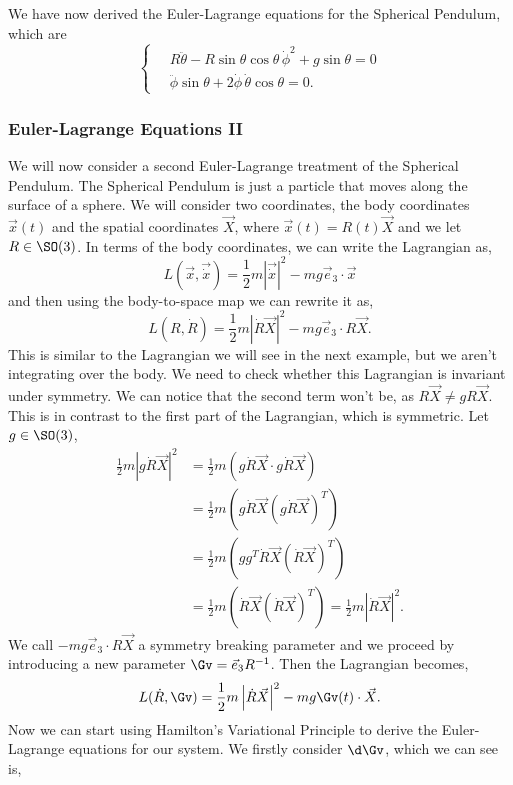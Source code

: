 We have now derived the Euler-Lagrange equations for the Spherical Pendulum, which are
$$ \begin{cases}
  \quad R\ddot{\theta} - R\sin \theta \cos \theta\,\dot \phi^2 + g\sin \theta = 0\\
  \quad\ddot\phi\sin \theta + 2\dot \phi\,\dot\theta\cos \theta = 0.
\end{cases} $$

\subsubsection{Euler-Lagrange Equations II}
We will now consider a second Euler-Lagrange treatment of the Spherical Pendulum. The Spherical Pendulum is just a particle that moves along the surface of a sphere. We will consider two coordinates, the body coordinates $\vec x(t)$ and the spatial coordinates $\vec X$, where $\vec x(t) = R(t)\vec X$ and we let $R \in \SO(3)$. In terms of the body coordinates, we can write the Lagrangian as,
$$ L(\vec x, \vec{\dot x}) = \frac{1}{2}m\left|\vec{\dot x}\right|^2 - mg\vec e_3 \cdot \vec x $$
and then using the body-to-space map we can rewrite it as,
$$ L\left(R, {\dot R}\right) = \frac{1}{2}m\left|{\dot R\vec X}\right|^2 - mg\vec e_3 \cdot R\vec {X}. $$
This is similar to the Lagrangian we will see in the next example, but we aren't integrating over the body. We need to check whether this Lagrangian is invariant under symmetry. We can notice that the second term won't be, as $R\vec{X} \ne gR\vec{X}$. This is in contrast to the first part of the Lagrangian, which is symmetric. Let $g \in \SO(3)$,
\begin{align*}
  \frac{1}{2}m\left|{g\dot R \vec X}\right|^2 &= \frac{1}{2}m\left({g\dot R \vec X} \cdot {g\dot R \vec X}\right)\\
  &= \frac{1}{2}m\left({g\dot R \vec X} \left({g\dot R \vec X}\right)^T\right)\\
  &= \frac{1}{2}m\left({gg^T}{\dot R \vec X} \left({\dot R \vec X}\right)^T\right)\\
  &= \frac{1}{2}m\left({\dot R \vec X} \left({\dot R \vec X}\right)^T\right) = \frac{1}{2}m\left|{\dot R \vec X}\right|^2.
\end{align*}
We call $-mg\vec e_3 \cdot R\vec{X}$ a symmetry breaking parameter and we proceed by introducing a new parameter $\Gv = \vec e_3R^{-1}$. Then the Lagrangian becomes,
$$ L(\dot R, \Gv) = \frac{1}{2}m\left| \dot R\vec X \right|^2 - mg\Gv(t) \cdot \vec X. $$
Now we can start using Hamilton's Variational Principle to derive the Euler-Lagrange equations for our system. We firstly consider $\d\Gv$, which we can see is,
